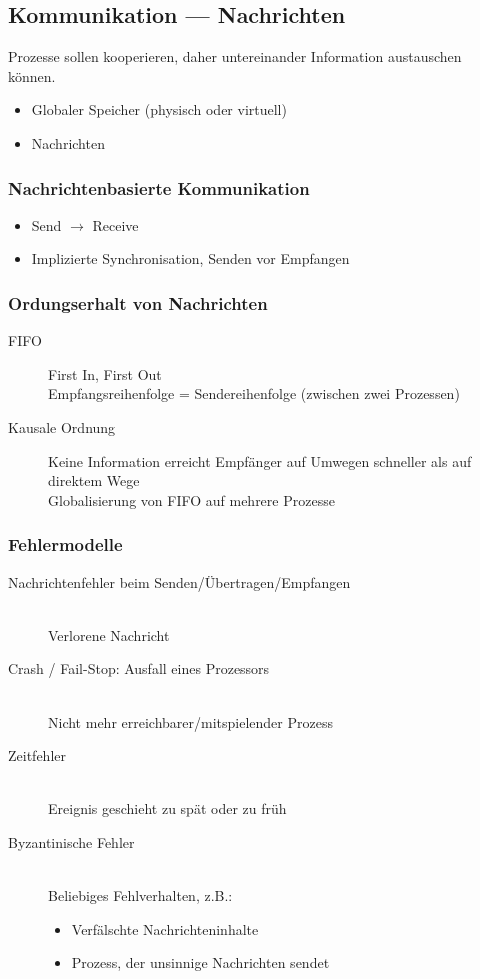 \documentclass[10pt,a4paper]{article}
\begin{document}
\subsection{Kommunikation --- Nachrichten}
Prozesse sollen kooperieren, daher untereinander Information austauschen können.
\begin{itemize}
\item Globaler Speicher (physisch oder virtuell)
\item Nachrichten
\end{itemize}

\subsubsection{Nachrichtenbasierte Kommunikation}
\begin{itemize}
\item Send $\rightarrow$ Receive
\item Implizierte Synchronisation, Senden vor Empfangen
\end{itemize}

\subsubsection{Ordungserhalt von Nachrichten}
\begin{description}
\item[FIFO] First In, First Out\\Empfangsreihenfolge = Sendereihenfolge (zwischen zwei Prozessen)
\item[Kausale Ordnung] Keine Information erreicht Empfänger auf Umwegen schneller als auf direktem Wege\\Globalisierung von FIFO auf mehrere Prozesse
\end{description}

\subsubsection{Fehlermodelle}
\begin{description}
\item[Nachrichtenfehler beim Senden/Übertragen/Empfangen]  \hfill \\Verlorene Nachricht
\item[Crash / Fail-Stop: Ausfall eines Prozessors] \hfill \\Nicht mehr erreichbarer/mitspielender Prozess
\item[Zeitfehler] \hfill \\Ereignis geschieht zu spät oder zu früh
\item[Byzantinische Fehler] \hfill \\Beliebiges Fehlverhalten, z.B.:
\begin{itemize}[topsep=-100ex]
\item Verfälschte Nachrichteninhalte
\item Prozess, der unsinnige Nachrichten sendet
\end{itemize}
\end{description}
\end{document}
